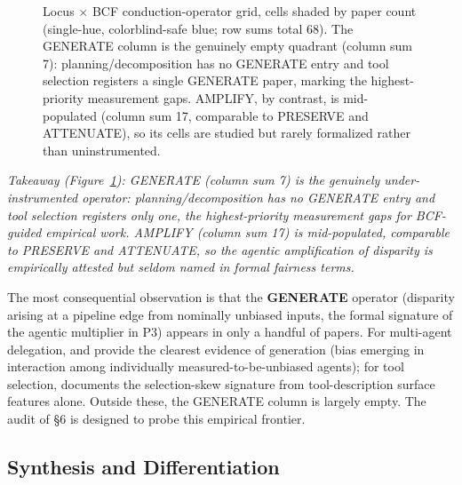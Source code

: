 \documentclass[acmsmall,nonacm]{acmart}
\begin{document}
\begin{figure}[htbp]
{%
}
\caption{Locus $\times$ BCF conduction-operator grid, cells shaded by paper count (single-hue, colorblind-safe blue; row sums total 68). The GENERATE column is the genuinely empty quadrant (column sum 7): planning/decomposition has no GENERATE entry and tool selection registers a single GENERATE paper, marking the highest-priority measurement gaps. AMPLIFY, by contrast, is mid-populated (column sum 17, comparable to PRESERVE and ATTENUATE), so its cells are studied but rarely formalized rather than uninstrumented.}
\label{fig:operator}
\end{figure}

\emph{Takeaway (Figure~\ref{fig:operator}): GENERATE (column sum 7) is the genuinely under-instrumented operator: planning/decomposition has no GENERATE entry and tool selection registers only one, the highest-priority measurement gaps for BCF-guided empirical work. AMPLIFY (column sum 17) is mid-populated, comparable to PRESERVE and ATTENUATE, so the agentic amplification of disparity is empirically attested but seldom named in formal fairness terms.}

The most consequential observation is that the \textbf{GENERATE} operator (disparity arising at a pipeline edge from nominally unbiased inputs, the formal signature of the agentic multiplier in P3) appears in only a handful of papers. For multi-agent delegation, \cite{nguyen2025social} and \cite{madigan2025emergent} provide the clearest evidence of generation (bias emerging in interaction among individually measured-to-be-unbiased agents); for tool selection, \cite{blankenstein2025biasbusters} documents the selection-skew signature from tool-description surface features alone. Outside these, the GENERATE column is largely empty. The audit of \S{}6 is designed to probe this empirical frontier.

\subsection{Synthesis and Differentiation}
\end{document}
